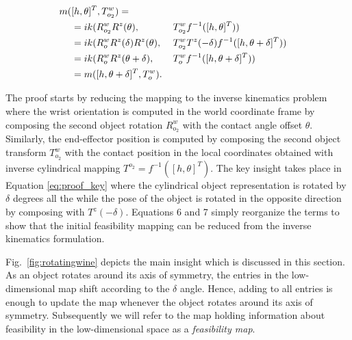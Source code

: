 \documentclass{aamas2015}
\begin{document}
\begin{alignat}{2}
  m(&[h,\theta]^T,T^w_{o_2}) 	=	\notag \\
				&= ik(R^w_{o_2} R^z(\theta), 			&&T^w_{o_2} f^{-1}([h,\theta]^T)) \\
				&= ik(R^w_o R^z(\delta) R^z(\theta), 		~&&T^w_{o_2} T^z(-\delta) f^{-1}([h,\theta+\delta]^T)) \label{eq:proof_key} \\
				&= ik(R^w_o R^z(\theta+\delta), 		&&T^w_o f^{-1}([h,\theta+\delta]^T)) \\
				&= m([h,\theta+\delta]^T, T^w_o). 				
\end{alignat}

The proof starts by reducing the mapping to the inverse kinematics problem where the wrist orientation is computed
in the world coordinate frame by composing the second object rotation $R^w_{o_2}$ with the contact angle offset $\theta$. Similarly,
the end-effector position is computed by composing the second object transform $T^w_{o_2}$ with the contact position
in the local coordinates obtained with inverse cylindrical mapping $T^{o_2} = f^{-1}([h,\theta]^T)$. The key
insight takes place in Equation \ref{eq:proof_key} where the cylindrical object representation is rotated by $\delta$
degrees all the while the pose of the object is rotated in the opposite direction by composing with
$T^z(-\delta)$. Equations 6 and 7 simply reorganize the terms to show that the initial feasibility
mapping can be reduced from the inverse kinematics formulation.

Fig.~\ref{fig:rotatingwine} depicts the main insight which is discussed in this section. As an object rotates around its axis of symmetry, the entries in the low-dimensional map shift according to the $\delta$ angle. Hence, adding to all entries is enough to update the map whenever the object rotates around its axis of symmetry. Subsequently we will refer to the map holding information about feasibility in the low-dimensional space as a \emph{feasibility map}. 
\end{document}
